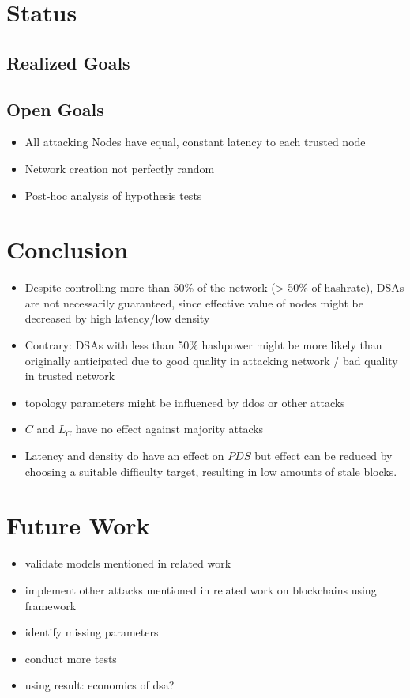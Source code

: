 \documentclass[a4paper,12pt,twoside]{report}
\begin{document}
\section{Status}

\subsection{Realized Goals}

\subsection{Open Goals}
\begin{itemize}
\item All attacking Nodes have equal, constant latency to each trusted node
\item Network creation not perfectly random
\item Post-hoc analysis of hypothesis tests
\end{itemize}
\section{Conclusion}
\begin{itemize}
\item Despite controlling more than 50\% of the network (> 50\% of hashrate), DSAs are not necessarily guaranteed, since effective value of nodes might be decreased by high latency/low density
\item Contrary: DSAs with less than 50\% hashpower might be more likely than originally anticipated due to good quality in attacking network / bad quality in trusted network
\item topology parameters might be influenced by ddos or other attacks
\item $C$ and $L_C$ have no effect against majority attacks
\item Latency and density do have an effect on $PDS$ but effect can be reduced by choosing a suitable difficulty target, resulting in low amounts of stale blocks.
\end{itemize}
\section{Future Work}
\begin{itemize}
\item validate models mentioned in related work
\item implement other attacks mentioned in related work on blockchains using framework
\item identify missing parameters
\item conduct more tests
\item using result: economics of dsa?
\end{itemize}
\end{document}
